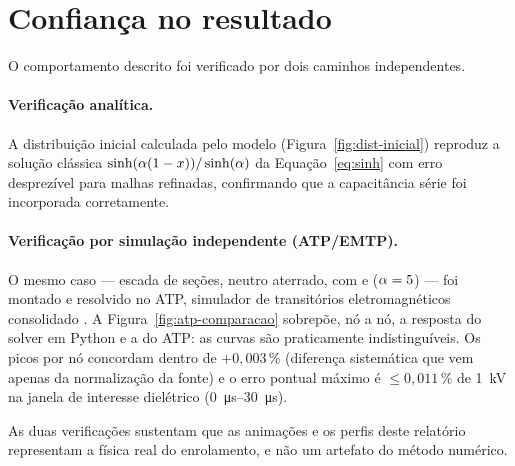 \section{Confiança no resultado}
\label{sec:validacao-quantitativa}

O comportamento descrito foi verificado por dois caminhos independentes.

\paragraph{Verificação analítica.} A distribuição inicial calculada pelo modelo
(Figura~\ref{fig:dist-inicial}) reproduz a solução clássica \(\sinh(\alpha(1-x))/\sinh(\alpha)\) da
Equação~\eqref{eq:sinh} com erro desprezível para malhas refinadas, confirmando que a capacitância
série foi incorporada corretamente.

\paragraph{Verificação por simulação independente (ATP/EMTP).} O mesmo caso — escada de \Nsec{} seções,
neutro aterrado, com \Cg{} e \Cs{} (\(\alpha=5\)) — foi montado e resolvido no ATP, simulador de
transitórios eletromagnéticos consolidado \cite{dommel1969}. A Figura~\ref{fig:atp-comparacao} sobrepõe,
nó a nó, a resposta do solver em Python e a do ATP: as curvas são praticamente indistinguíveis. Os picos
por nó concordam dentro de \(+0{,}003\,\%\) (diferença sistemática que vem apenas da normalização da
fonte) e o erro pontual máximo é \(\le 0{,}011\,\%\) de \SI{1}{kV} na janela de interesse dielétrico
(\SIrange{0}{30}{\micro\second}).


As duas verificações sustentam que as animações e os perfis deste relatório representam a física real do
enrolamento, e não um artefato do método numérico.
